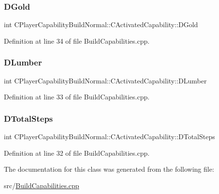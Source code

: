 \subsubsection{\texorpdfstring{D\+Gold}{DGold}}
{\footnotesize\ttfamily int C\+Player\+Capability\+Build\+Normal\+::\+C\+Activated\+Capability\+::\+D\+Gold\hspace{0.3cm}{\ttfamily [protected]}}



Definition at line 34 of file Build\+Capabilities.\+cpp.

\hypertarget{classCPlayerCapabilityBuildNormal_1_1CActivatedCapability_acc7750973121c2b8ada035bca9264229}{}\label{classCPlayerCapabilityBuildNormal_1_1CActivatedCapability_acc7750973121c2b8ada035bca9264229} 
\subsubsection{\texorpdfstring{D\+Lumber}{DLumber}}
{\footnotesize\ttfamily int C\+Player\+Capability\+Build\+Normal\+::\+C\+Activated\+Capability\+::\+D\+Lumber\hspace{0.3cm}{\ttfamily [protected]}}



Definition at line 33 of file Build\+Capabilities.\+cpp.

\hypertarget{classCPlayerCapabilityBuildNormal_1_1CActivatedCapability_a50e3103232671fc231348e7a86c1fed5}{}\label{classCPlayerCapabilityBuildNormal_1_1CActivatedCapability_a50e3103232671fc231348e7a86c1fed5} 
\subsubsection{\texorpdfstring{D\+Total\+Steps}{DTotalSteps}}
{\footnotesize\ttfamily int C\+Player\+Capability\+Build\+Normal\+::\+C\+Activated\+Capability\+::\+D\+Total\+Steps\hspace{0.3cm}{\ttfamily [protected]}}



Definition at line 32 of file Build\+Capabilities.\+cpp.



The documentation for this class was generated from the following file\+:\begin{DoxyCompactItemize}
\item 
src/\hyperlink{BuildCapabilities_8cpp}{Build\+Capabilities.\+cpp}\end{DoxyCompactItemize}
